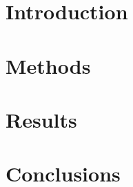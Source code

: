 \documentclass[english,a4paper,12pt]{report}
\begin{document}
\tableofcontents

\newpage

 \cleardoublepage
 \storeinipagenumber




 \setcounter{page}{1}

\thispagestyle{empty}

\chapter{Introduction}




%
%
\chapter{Methods}








%

\chapter{Results}




\chapter{Conclusions}



{}

\end{document}
